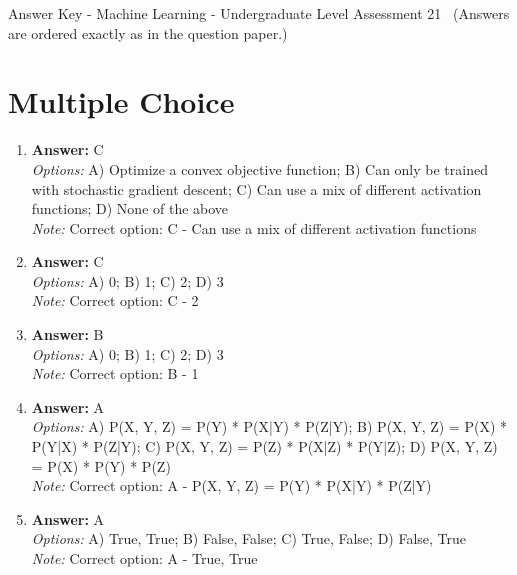 \documentclass[12pt]{article}
\begin{document}
\begin{center}
Answer Key - Machine Learning - Undergraduate Level Assessment 21 \
\small (Answers are ordered exactly as in the question paper.)
\end{center}

\section*{Multiple Choice}
\begin{enumerate}[label=\arabic*.]
\item \textbf{Answer:} C
\\ \textit{Options:} A) Optimize a convex objective function; B) Can only be trained with stochastic gradient descent; C) Can use a mix of different activation functions; D) None of the above
\\ \textit{Note:} Correct option: C - Can use a mix of different activation functions
\item \textbf{Answer:} C
\\ \textit{Options:} A) 0; B) 1; C) 2; D) 3
\\ \textit{Note:} Correct option: C - 2
\item \textbf{Answer:} B
\\ \textit{Options:} A) 0; B) 1; C) 2; D) 3
\\ \textit{Note:} Correct option: B - 1
\item \textbf{Answer:} A
\\ \textit{Options:} A) P(X, Y, Z) = P(Y) * P(X|Y) * P(Z|Y); B) P(X, Y, Z) = P(X) * P(Y|X) * P(Z|Y); C) P(X, Y, Z) = P(Z) * P(X|Z) * P(Y|Z); D) P(X, Y, Z) = P(X) * P(Y) * P(Z)
\\ \textit{Note:} Correct option: A - P(X, Y, Z) = P(Y) * P(X|Y) * P(Z|Y)
\item \textbf{Answer:} A
\\ \textit{Options:} A) True, True; B) False, False; C) True, False; D) False, True
\\ \textit{Note:} Correct option: A - True, True
\end{enumerate}
\end{document}
